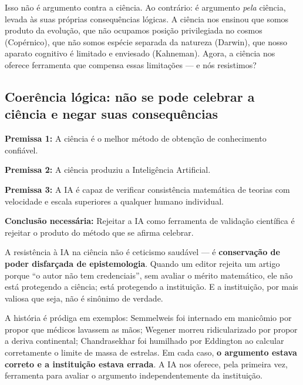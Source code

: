 \documentclass[12pt, a4paper]{article}
\begin{document}
Isso não é argumento contra a ciência. Ao contrário: é argumento \textit{pela} ciência, levada às suas próprias consequências lógicas. A ciência nos ensinou que somos produto da evolução, que não ocupamos posição privilegiada no cosmos (Copérnico), que não somos espécie separada da natureza (Darwin), que nosso aparato cognitivo é limitado e enviesado (Kahneman). Agora, a ciência nos oferece ferramenta que compensa essas limitações --- e nós resistimos?

\subsection{Coerência lógica: não se pode celebrar a ciência e negar suas consequências}\label{sec:coerencia}

\begin{reflexao}
\textbf{Premissa 1:} A ciência é o melhor método de obtenção de conhecimento confiável.

\textbf{Premissa 2:} A ciência produziu a Inteligência Artificial.

\textbf{Premissa 3:} A IA é capaz de verificar consistência matemática de teorias com velocidade e escala superiores a qualquer humano individual.

\textbf{Conclusão necessária:} Rejeitar a IA como ferramenta de validação científica é rejeitar o produto do método que se afirma celebrar.
\end{reflexao}

A resistência à IA na ciência não é ceticismo saudável --- é \textbf{conservação de poder disfarçada de epistemologia}. Quando um editor rejeita um artigo porque ``o autor não tem credenciais'', sem avaliar o mérito matemático, ele não está protegendo a ciência; está protegendo a instituição. E a instituição, por mais valiosa que seja, não é sinônimo de verdade.

A história é pródiga em exemplos: Semmelweis foi internado em manicômio por propor que médicos lavassem as mãos; Wegener morreu ridicularizado por propor a deriva continental; Chandrasekhar foi humilhado por Eddington ao calcular corretamente o limite de massa de estrelas. Em cada caso, \textbf{o argumento estava correto e a instituição estava errada}. A IA nos oferece, pela primeira vez, ferramenta para avaliar o argumento independentemente da instituição.


\end{document}
